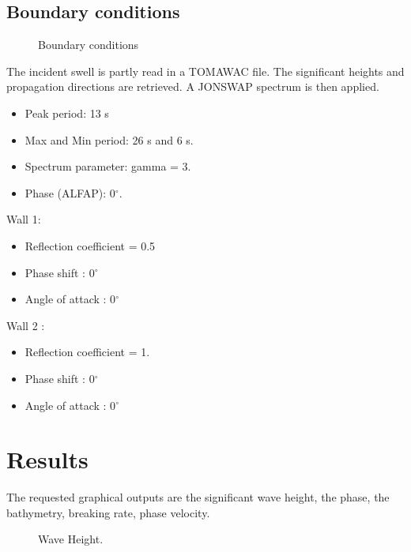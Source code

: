 \subsection{Boundary conditions}

\begin{figure}[h]
\begin{center}
\end{center}
\caption{Boundary conditions}
\label{fig:flam_bc}
\end{figure}

The incident swell is partly read in a TOMAWAC file. The significant heights
and propagation directions are retrieved. A JONSWAP spectrum is then applied.
\begin{itemize}
\item Peak period: 13 s
\item Max and Min period: 26 s and 6 s.
\item Spectrum parameter: gamma = 3.
\item Phase (ALFAP): 0$^\circ$.
\end{itemize}
Wall 1:
\begin{itemize}
\item Reflection coefficient = 0.5
\item Phase shift : 0$^\circ$
\item Angle of attack : 0$^\circ$
\end{itemize}
  Wall 2 :
\begin{itemize}
\item Reflection coefficient = 1.
\item Phase shift : 0$^\circ$
\item Angle of attack : 0$^\circ$
\end{itemize}

\section{Results}

The requested graphical outputs are the significant wave height, the phase,
the bathymetry, breaking rate, phase velocity.

\begin{figure}[h]
\begin{center}
\end{center}
\caption{Wave Height.}
\label{fig:flam_waveheight}
\end{figure}

